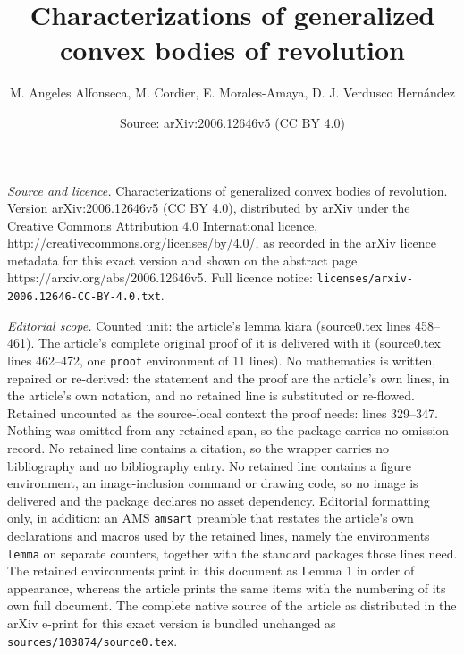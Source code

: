 \documentclass[10pt,a4paper]{amsart}
\title{Characterizations of generalized convex bodies of revolution}
\author{M. Angeles Alfonseca, M. Cordier, E. Morales-Amaya, D. J. Verdusco Hern\'andez}
\date{Source: arXiv:2006.12646v5 (CC BY 4.0)}
\begin{document}
\maketitle

\noindent\emph{Source and licence.} Characterizations of generalized convex bodies of revolution. Version arXiv:2006.12646v5 (CC BY 4.0), distributed by arXiv under the Creative Commons Attribution 4.0 International licence, http://creativecommons.org/licenses/by/4.0/, as recorded in the arXiv licence metadata for this exact version and shown on the abstract page https://arxiv.org/abs/2006.12646v5. Full licence notice: \texttt{licenses/arxiv-2006.12646-CC-BY-4.0.txt}.\par\smallskip

\noindent\textit{Editorial scope.} Counted unit: the article's lemma kiara (source0.tex lines 458--461). The article's complete original proof of it is delivered with it (source0.tex lines 462--472, one \texttt{proof} environment of 11 lines). No mathematics is written, repaired or re-derived: the statement and the proof are the article's own lines, in the article's own notation, and no retained line is substituted or re-flowed.  Retained uncounted as the source-local context the proof needs: lines 329--347.  Nothing was omitted from any retained span, so the package carries no omission record.  No retained line contains a citation, so the wrapper carries no bibliography and no bibliography entry.  No retained line contains a figure environment, an image-inclusion command or drawing code, so no image is delivered and the package declares no asset dependency.  Editorial formatting only, in addition: an AMS \texttt{amsart} preamble that restates the article's own declarations and macros used by the retained lines, namely the environments \texttt{lemma} on separate counters, together with the standard packages those lines need.  The retained environments print in this document as Lemma 1 in order of appearance, whereas the article prints the same items with the numbering of its own full document.  The complete native source of the article as distributed in the arXiv e-print for this exact version is bundled unchanged as \texttt{sources/103874/source0.tex}.
\end{document}
